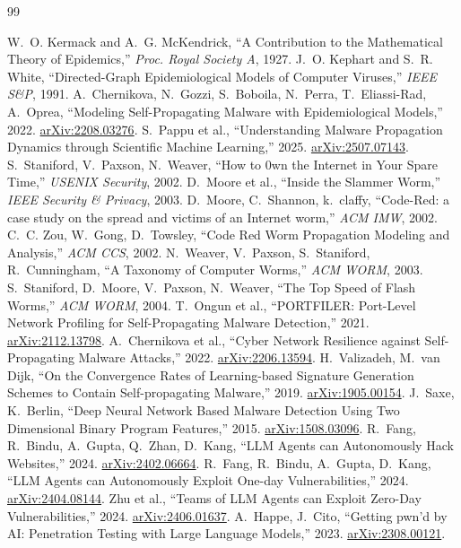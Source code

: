 \documentclass[11pt,a4paper]{article}
\newcommand{\arxiv}[1]{\href{https://arxiv.org/abs/#1}{arXiv:#1}}
\begin{document}
\begin{thebibliography}{99}
\small

 W.~O. Kermack and A.~G. McKendrick, ``A Contribution to the Mathematical Theory of Epidemics,'' \emph{Proc. Royal Society A}, 1927.
 J.~O. Kephart and S.~R. White, ``Directed-Graph Epidemiological Models of Computer Viruses,'' \emph{IEEE S\&P}, 1991.
 A.~Chernikova, N.~Gozzi, S.~Boboila, N.~Perra, T.~Eliassi-Rad, A.~Oprea, ``Modeling Self-Propagating Malware with Epidemiological Models,'' 2022. \arxiv{2208.03276}.
 S.~Pappu et al., ``Understanding Malware Propagation Dynamics through Scientific Machine Learning,'' 2025. \arxiv{2507.07143}.
 S.~Staniford, V.~Paxson, N.~Weaver, ``How to 0wn the Internet in Your Spare Time,'' \emph{USENIX Security}, 2002.
 D.~Moore et al., ``Inside the Slammer Worm,'' \emph{IEEE Security \& Privacy}, 2003.
 D.~Moore, C.~Shannon, k.~claffy, ``Code-Red: a case study on the spread and victims of an Internet worm,'' \emph{ACM IMW}, 2002.
 C.~C. Zou, W.~Gong, D.~Towsley, ``Code Red Worm Propagation Modeling and Analysis,'' \emph{ACM CCS}, 2002.
 N.~Weaver, V.~Paxson, S.~Staniford, R.~Cunningham, ``A Taxonomy of Computer Worms,'' \emph{ACM WORM}, 2003.
 S.~Staniford, D.~Moore, V.~Paxson, N.~Weaver, ``The Top Speed of Flash Worms,'' \emph{ACM WORM}, 2004.
 T.~Ongun et al., ``PORTFILER: Port-Level Network Profiling for Self-Propagating Malware Detection,'' 2021. \arxiv{2112.13798}.
 A.~Chernikova et al., ``Cyber Network Resilience against Self-Propagating Malware Attacks,'' 2022. \arxiv{2206.13594}.
 H.~Valizadeh, M.~van Dijk, ``On the Convergence Rates of Learning-based Signature Generation Schemes to Contain Self-propagating Malware,'' 2019. \arxiv{1905.00154}.
 J.~Saxe, K.~Berlin, ``Deep Neural Network Based Malware Detection Using Two Dimensional Binary Program Features,'' 2015. \arxiv{1508.03096}.
 R.~Fang, R.~Bindu, A.~Gupta, Q.~Zhan, D.~Kang, ``LLM Agents can Autonomously Hack Websites,'' 2024. \arxiv{2402.06664}.
 R.~Fang, R.~Bindu, A.~Gupta, D.~Kang, ``LLM Agents can Autonomously Exploit One-day Vulnerabilities,'' 2024. \arxiv{2404.08144}.
 Zhu et al., ``Teams of LLM Agents can Exploit Zero-Day Vulnerabilities,'' 2024. \arxiv{2406.01637}.
 A.~Happe, J.~Cito, ``Getting pwn'd by AI: Penetration Testing with Large Language Models,'' 2023. \arxiv{2308.00121}.

\end{thebibliography}
\end{document}
